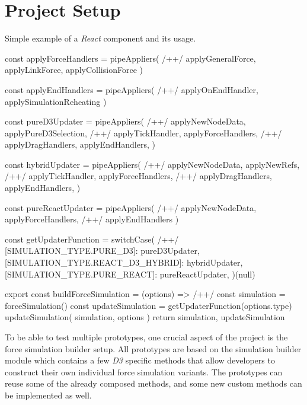 \section{Project Setup}
\label{sub:projectSetup}

\begin{program}
\caption{Simple example of a \emph{React} component and its usage.} 
\label{prog:forceBuildModule}
\begin{JsCode}
const applyForceHandlers = pipeAppliers( /+\label{line:composition1}+/
  applyGeneralForce, 
  applyLinkForce, 
  applyCollisionForce
)

const applyEndHandlers = pipeAppliers( /+\label{line:composition2}+/
  applyOnEndHandler, 
  applySimulationReheating
)

const pureD3Updater = pipeAppliers( /+\label{line:updater1}+/
  applyNewNodeData,
  applyPureD3Selection, /+\label{line:applyPureD3Selection}+/
  applyTickHandler,
  applyForceHandlers, /+\label{line:applyForce1}+/
  applyDragHandlers,
  applyEndHandlers,
)

const hybridUpdater = pipeAppliers( /+\label{line:updater2}+/
  applyNewNodeData,
  applyNewRefs, /+\label{line:applyNewRefs}+/
  applyTickHandler,
  applyForceHandlers, /+\label{line:applyForce2}+/
  applyDragHandlers,
  applyEndHandlers,
)

const pureReactUpdater = pipeAppliers( /+\label{line:updater3}+/
  applyNewNodeData, 
  applyForceHandlers, /+\label{line:applyForce3}+/
  applyEndHandlers
)

const getUpdaterFunction = switchCase({ /+\label{line:getUpdaterFunction}+/
  [SIMULATION_TYPE.PURE_D3]: pureD3Updater,
  [SIMULATION_TYPE.REACT_D3_HYBRID]: hybridUpdater,
  [SIMULATION_TYPE.PURE_REACT]: pureReactUpdater,
})(null)

export const buildForceSimulation = (options) => { /+\label{line:buildForceSimulationFn}+/
  const simulation = forceSimulation()
  const updateSimulation = getUpdaterFunction(options.type)
  updateSimulation({ simulation, options })
  return { simulation, updateSimulation }
}
\end{JsCode}
\end{program}

\afterpage{\clearpage}

To be able to test multiple prototypes, one crucial aspect of the project is the force simulation builder setup. All prototypes are based on the simulation builder module which contains a few \emph{D3} specific methods that allow developers to construct their own individual force simulation variants. The prototypes can reuse some of the already composed methods, and some new custom methods can be implemented as well.

